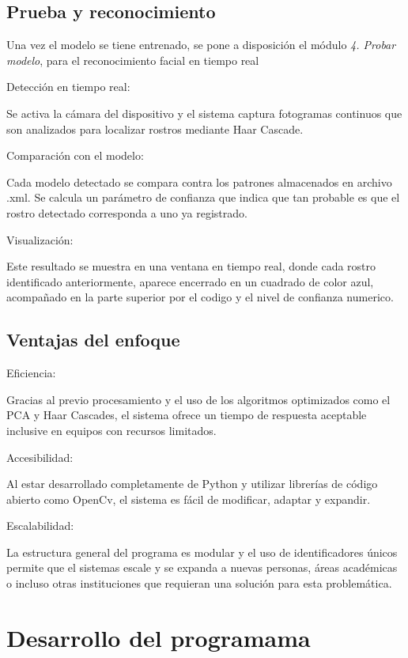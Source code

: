 \documentclass[12pt]{article}
\begin{document}
{\subsection{Prueba y reconocimiento}
Una vez el modelo se tiene entrenado, se pone a disposición el módulo \textit{4. Probar modelo}, para el reconocimiento facial en tiempo real
\begin{itemize}
	{\bfseries\item Detección en tiempo real:}Se activa la cámara del dispositivo y el sistema captura fotogramas continuos que son analizados para localizar rostros mediante Haar Cascade.
	{\bfseries\item Comparación con el modelo:}Cada modelo detectado se compara contra los patrones almacenados en archivo .xml. Se calcula un parámetro de confianza que indica que tan probable es que el rostro detectado corresponda a uno ya registrado.
	{\bfseries\item Visualización:} Este resultado se muestra en una ventana en tiempo real, donde cada rostro identificado anteriormente, aparece encerrado en un cuadrado de color azul, acompañado en la parte superior por el codigo y el nivel de confianza numerico.
\end{itemize}

\subsection{Ventajas del enfoque}
\begin{itemize}
    {\bfseries\item Eficiencia:} Gracias al previo procesamiento y el uso de los algoritmos optimizados como el PCA y Haar Cascades, el sistema ofrece un tiempo de respuesta aceptable inclusive en equipos con recursos limitados.
    {\bfseries\item Accesibilidad:} Al estar desarrollado completamente de Python y utilizar librerías de código abierto como OpenCv, el sistema es fácil de modificar, adaptar y expandir.
    {\bfseries\item Escalabilidad:} La estructura general del programa es modular y el uso de identificadores únicos permite que el sistemas escale y se expanda a nuevas personas, áreas académicas o incluso otras instituciones que requieran una solución para esta problemática.
\end{itemize}

\section{Desarrollo del programama}
}
\end{document}
